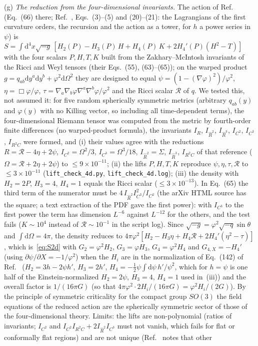 \documentclass[11pt]{article}
\begin{document}
(g) \emph{The reduction from the four-dimensional invariants.} The action of Ref.~\cite{BorissovaCarballoRubio2026} (Eq.~(66) there; Ref.~\cite{BuenoCanoHennigarMurcia2025}, Eqs.~(3)--(5) and (20)--(21): the Lagrangians of the first curvature orders, the recursion and the action as a tower, for $h$ a power series in $\psi$) is $S=\int\!\mathrm d^{4}x\sqrt{-g}\,[H_2(P)-H_3(P)\,H+H_4(P)\,K+2H_4'(P)(H^{2}-T)]$ with the four scalars $P,H,T,K$ built from the Zakhary--McIntosh invariants of the Ricci and Weyl tensors (their Eqs.~(55), (63)--(65)); on the warped product $g=q_{ab}\mathrm dy^{a}\mathrm dy^{b}+\varphi^{2}\mathrm d\Omega^{2}$ they are designed to equal $\psi=(1-(\nabla\varphi)^{2})/\varphi^{2}$, $\eta=\Box\varphi/\varphi$, $\tau=\nabla_a\nabla_b\varphi\nabla^a\nabla^b\varphi/\varphi^{2}$ and the Ricci scalar $\mathcal R$ of $q$. We tested this, not assumed it: for five random spherically symmetric metrics (arbitrary $q_{ab}(y)$ and $\varphi(y)$ with no Killing vector, so including all time-dependent terms), the four-dimensional Riemann tensor was computed from the metric by fourth-order finite differences (no warped-product formula), the invariants $I_R$, $I_{\hat R^{2}}$, $I_{\hat R^{3}}$, $I_{C^{2}}$, $I_{C^{3}}$, $I_{R^{2}C}$ were formed, and (i) their values agree with the reductions $R=\mathcal R-4\eta+2\psi$, $I_{C^{2}}=\Omega^{2}/3$, $I_{C^{3}}=\Omega^{3}/18$, $I_{\hat R^{2}}=\Sigma$, $I_{\hat R^{3}}$, $I_{R^{2}C}$ of that reference ($\Omega=\mathcal R+2\eta+2\psi$) to $\le9\times10^{-11}$; (ii) the lifts $P,H,T,K$ reproduce $\psi,\eta,\tau,\mathcal R$ to $\le3\times10^{-11}$ (\texttt{lift\_check\_4d.py}, \texttt{lift\_check\_4d.log}); (iii) the density with $H_2=2P$, $H_3=4$, $H_4=1$ equals the Ricci scalar ($\le3\times10^{-13}$). In Eq.~(65) the third term of the numerator must be $4\,I_{\hat R^{2}}I_{C^{3}}^{2}/I_{C^{2}}$ (the arXiv HTML source has the square; a text extraction of the PDF gave the first power): with $I_{C^{3}}$ to the first power the term has dimension $L^{-6}$ against $L^{-12}$ for the others, and the test fails ($K\sim10^{4}$ instead of $\mathcal R\sim10^{-1}$ in the script log). Since $\sqrt{-g}=\varphi^{2}\sqrt{-q}\sin\theta$ and $\int\!\mathrm d\Omega=4\pi$, the density reduces to $4\pi\varphi^{2}[H_2-H_3\eta+H_4\mathcal R+2H_4'(\eta^{2}-\tau)]$, which is~\eqref{eq:S2d} with $G_2=\varphi^{2}H_2$, $G_3=\varphi H_3$, $G_4=\varphi^{2}H_4$ and $G_{4,X}=-H_4'$ (using $\partial\psi/\partial X=-1/\varphi^{2}$) when the $H_i$ are in the normalization of Eq.~(142) of Ref.~\cite{BorissovaCarballoRubio2026} ($H_2=3h-2\psi h'$, $H_3=2h'$, $H_4=-\tfrac12\psi\!\int\!\mathrm d\psi\,h'/\psi^{2}$, which for $h=\psi$ is one half of the Einstein-normalized $H_2=2\psi$, $H_3=4$, $H_4=1$ used in~(iii)) and the overall factor is $1/(16\pi G)$ (so that $4\pi\varphi^{2}\cdot2H_i/(16\pi G)=\varphi^{2}H_i/(2G)$). By the principle of symmetric criticality for the compact group $SO(3)$ the field equations of the reduced action are the spherically symmetric sector of those of the four-dimensional theory. Limits: the lifts are non-polynomial (ratios of invariants; $I_{C^{2}}$ and $I_{C^{2}}I_{R^{2}C}+2I_{\hat R^{2}}I_{C^{3}}$ must not vanish, which fails for flat or conformally flat regions) and are not unique (Ref.~\cite{BorissovaCarballoRubio2026} notes that other 
\end{document}

